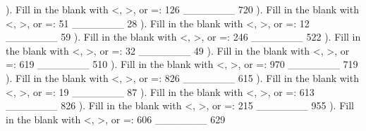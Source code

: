\documentclass{article}%
\begin{document}
\newline%
). Fill in the blank with <, >, or =: 126 \_\_\_\_\_\_\_ 720%
\newline%
\newline%
). Fill in the blank with <, >, or =: 51 \_\_\_\_\_\_\_ 28%
\newline%
\newline%
). Fill in the blank with <, >, or =: 12 \_\_\_\_\_\_\_ 59%
\newline%
\newline%
). Fill in the blank with <, >, or =: 246 \_\_\_\_\_\_\_ 522%
\newline%
\newline%
). Fill in the blank with <, >, or =: 32 \_\_\_\_\_\_\_ 49%
\newline%
\newline%
). Fill in the blank with <, >, or =: 619 \_\_\_\_\_\_\_ 510%
\newline%
\newline%
). Fill in the blank with <, >, or =: 970 \_\_\_\_\_\_\_ 719%
\newline%
\newline%
). Fill in the blank with <, >, or =: 826 \_\_\_\_\_\_\_ 615%
\newline%
\newline%
). Fill in the blank with <, >, or =: 19 \_\_\_\_\_\_\_ 87%
\newline%
\newline%
). Fill in the blank with <, >, or =: 613 \_\_\_\_\_\_\_ 826%
\newline%
\newline%
). Fill in the blank with <, >, or =: 215 \_\_\_\_\_\_\_ 955%
\newline%
\newline%
). Fill in the blank with <, >, or =: 606 \_\_\_\_\_\_\_ 629%
\newline%
\newline%
\end{document}
